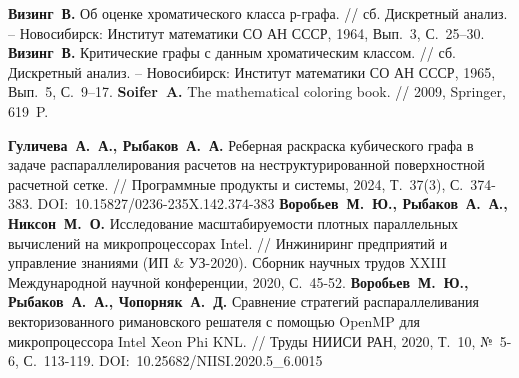 \begin{thebibliography}{99}



%
\textbf{Визинг~В.} Об оценке хроматического класса р-графа. // сб. Дискретный анализ. -- Новосибирск: Институт математики СО АН СССР, 1964, Вып.~3, С.~25–30.
%
\textbf{Визинг~В.} Критические графы с данным хроматическим классом. // сб. Дискретный анализ. -- Новосибирск: Институт математики СО АН СССР, 1965, Вып.~5, С.~9–17.
%
\textbf{Soifer~A.} The mathematical coloring book. // 2009, Springer, 619~P.
%

%
\textbf{Гуличева~А.~А., Рыбаков~А.~А.} Реберная раскраска кубического графа в задаче распараллелирования расчетов на неструктурированной поверхностной расчетной сетке. // Программные продукты и системы, 2024, Т.~37(3), С.~374-383. DOI:~10.15827/0236-235X.142.374-383
%
\textbf{Воробьев~М.~Ю., Рыбаков~А.~А., Никсон~М.~О.} Исследование масштабируемости плотных параллельных вычислений на микропроцессорах Intel. // Инжиниринг предприятий и управление знаниями (ИП \& УЗ-2020). Сборник научных трудов XXIII Международной научной конференции, 2020, С.~45-52.
%
\textbf{Воробьев~М.~Ю., Рыбаков~А.~А., Чопорняк~А.~Д.} Сравнение стратегий распараллеливания векторизованного римановского решателя с помощью OpenMP для микропроцессора Intel Xeon Phi KNL. // Труды НИИСИ РАН, 2020, Т.~10, №~5-6, С.~113-119. DOI:~10.25682/NIISI.2020.5\_6.0015
%






\end{thebibliography}
